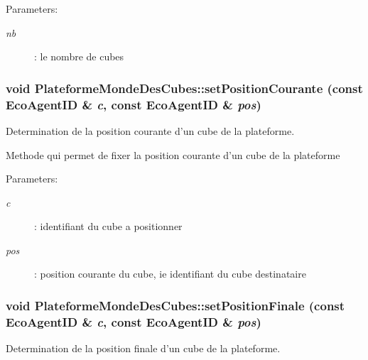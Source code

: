 \begin{Desc}
\item[Parameters:]
\begin{description}
\item[{\em nb}]: le nombre de cubes \end{description}
\end{Desc}
\hypertarget{classPlateformeMondeDesCubes_ecc518787fb8231be37e7b8eb3c5390e}{
\subsubsection[{setPositionCourante}]{\setlength{\rightskip}{0pt plus 5cm}void PlateformeMondeDesCubes::setPositionCourante (const {\bf EcoAgentID} \& {\em c}, \/  const {\bf EcoAgentID} \& {\em pos})}}
\label{classPlateformeMondeDesCubes_ecc518787fb8231be37e7b8eb3c5390e}


Determination de la position courante d'un cube de la plateforme. 

Methode qui permet de fixer la position courante d'un cube de la plateforme

\begin{Desc}
\item[Parameters:]
\begin{description}
\item[{\em c}]: identifiant du cube a positionner \item[{\em pos}]: position courante du cube, ie identifiant du cube destinataire \end{description}
\end{Desc}
\hypertarget{classPlateformeMondeDesCubes_315f30b3c7c1e8bc9ec828a66a5813e5}{
\subsubsection[{setPositionFinale}]{\setlength{\rightskip}{0pt plus 5cm}void PlateformeMondeDesCubes::setPositionFinale (const {\bf EcoAgentID} \& {\em c}, \/  const {\bf EcoAgentID} \& {\em pos})}}
\label{classPlateformeMondeDesCubes_315f30b3c7c1e8bc9ec828a66a5813e5}


Determination de la position finale d'un cube de la plateforme. 

